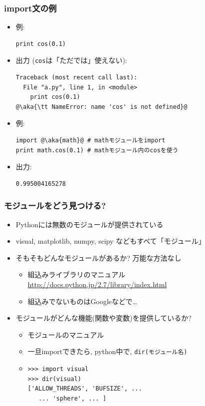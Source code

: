 \documentclass[10pt,dvipdfmx]{beamer}
\newcommand{\ao}[1]{{\color{blue}#1}}
\newcommand{\aka}[1]{{\color{red}#1}}
\begin{document}
\begin{frame}[fragile]
\frametitle{import文の例}
\begin{itemize}
\item 例:
\begin{lstlisting}
print cos(0.1)
\end{lstlisting}
\item 出力 ({\tt cos}は「ただでは」使えない):
\begin{lstlisting}
Traceback (most recent call last):
  File "a.py", line 1, in <module>
    print cos(0.1)
@\aka{\tt NameError: name 'cos' is not defined}@
\end{lstlisting}
\item 例:
\begin{lstlisting}
import @\aka{math}@ # mathモジュールをimport
print math.cos(0.1) # mathモジュール内のcosを使う
\end{lstlisting}
\item 出力:
\begin{lstlisting}
0.995004165278
\end{lstlisting}
\end{itemize}
\end{frame}


\begin{frame}[fragile]
\frametitle{モジュールをどう見つける?}
\begin{itemize}
\item Pythonには無数のモジュールが提供されている
\item visual, matplotlib, numpy, scipy などもすべて「モジュール」
\item そもそもどんなモジュールがあるか? 万能な方法なし
  \begin{itemize}
  \item 組込みライブラリのマニュアル
    \url{http://docs.python.jp/2.7/library/index.html}
  \item 組込みでないものはGoogleなどで\ldots
  \end{itemize}
\item モジュールがどんな機能(関数や変数)を提供しているか?
  \begin{itemize}
  \item モジュールのマニュアル
  \item 一旦importできたら, python中で, \ao{\tt dir(モジュール名)}
  \item 
\begin{lstlisting}
>>> import visual
>>> dir(visual)
['ALLOW_THREADS', 'BUFSIZE', ...
   ... 'sphere', ... ]
\end{lstlisting}
  \end{itemize}
\end{itemize}
\end{frame}
\end{document}
